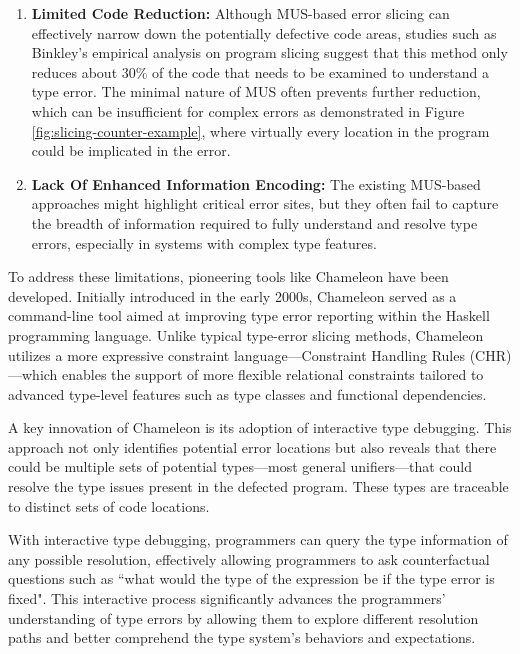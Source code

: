 \begin{enumerate}
  \item {
    \textbf{Limited Code Reduction:} Although MUS-based error slicing can effectively narrow down the potentially defective code areas, studies such as Binkley's empirical analysis on program slicing \cite{binkley_empirical_2007} suggest that this method only reduces about 30\% of the code that needs to be examined to understand a type error. The minimal nature of MUS often prevents further reduction, which can be insufficient for complex errors as demonstrated in Figure \ref{fig:slicing-counter-example}, where virtually every location in the program could be implicated in the error.
  }

  \item{
    \textbf{Lack Of Enhanced Information Encoding:}  The existing MUS-based approaches might highlight critical error sites, but they often fail to capture the breadth of information required to fully understand and resolve type errors, especially in systems with complex type features.
  }
\end{enumerate}

To address these limitations, pioneering tools like Chameleon \cite{Stuckey2003-pz} have been developed. Initially introduced in the early 2000s, Chameleon served as a command-line tool aimed at improving type error reporting within the Haskell programming language. Unlike typical type-error slicing methods, Chameleon utilizes a more expressive constraint language—Constraint Handling Rules (CHR)—which enables the support of more flexible relational constraints tailored to advanced type-level features such as type classes and functional dependencies.

A key innovation of Chameleon is its adoption of interactive type debugging. This approach not only identifies potential error locations but also reveals that there could be multiple sets of potential types—most general unifiers—that could resolve the type issues present in the defected program. These types are traceable to distinct sets of code locations.

With interactive type debugging, programmers can query the type information of any possible resolution, effectively allowing programmers to ask counterfactual questions such as ``what would the type of the expression be if the type error is fixed". This interactive process significantly advances the programmers' understanding of type errors by allowing them to explore different resolution paths and better comprehend the type system's behaviors and expectations.

